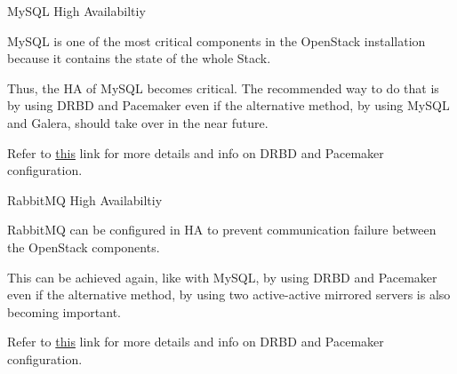 \documentclass[english,serif,mathserif]{beamer}
\begin{document}
\begin{frame}{MySQL High Availabiltiy}

MySQL is one of the most critical components in the OpenStack installation because 
it contains the state of the whole Stack.

\vspace{5 mm}

Thus, the HA of MySQL becomes critical. The recommended way to do that is by using DRBD and Pacemaker 
even if the alternative method, by using MySQL and Galera, should take over in the near future.

\vspace{5 mm}

Refer to {\color{blue}\href{http://docs.openstack.org/high-availability-guide/content/s-mysql.html}{this}} 
link for more details and info on DRBD and Pacemaker configuration.

\end{frame}

\begin{frame}{RabbitMQ High Availabiltiy}

RabbitMQ can be configured in HA to prevent communication failure between the OpenStack components.

\vspace{5 mm}

This can be achieved again, like with MySQL, by using DRBD and Pacemaker even if the alternative
method, by using two active-active mirrored servers is also becoming important. 

\vspace{5 mm}

Refer to {\color{blue}\href{http://docs.openstack.org/high-availability-guide/content/s-rabbitmq.html}{this}} 
link for more details and info on DRBD and Pacemaker configuration.

\end{frame}
\end{document}
